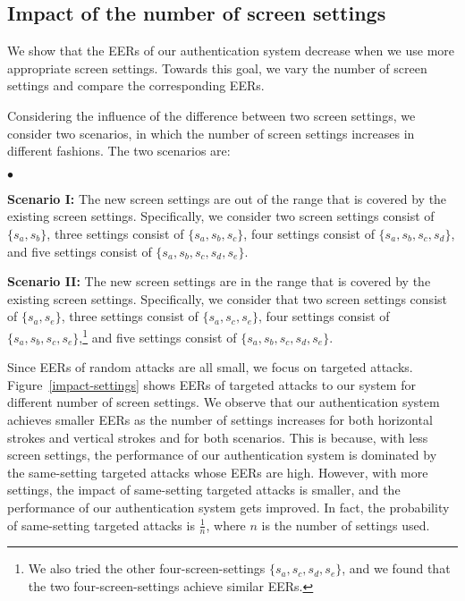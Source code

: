 \documentclass{sig-alternate-05-2015}
\newenvironment{packeditemize}{\begin{list}{$\bullet$}{\setlength{\itemsep}{2pt}\addtolength{\labelwidth}{4pt}\setlength{\leftmargin}{20pt}\setlength{\listparindent}{\parindent}\setlength{\parsep}{0pt}\setlength{\topsep}{0pt}}}{\end{list}}
\begin{document}
\subsection{Impact of the number of screen settings} We show that the EERs of our authentication system decrease when we use more appropriate screen settings. 
Towards this goal, we vary the number of screen settings and compare the corresponding EERs.

Considering the influence of the difference between two screen settings, we consider two scenarios, in which the number of screen settings increases in different fashions. 
The two scenarios are:
\begin{packeditemize}
\item {\bf Scenario I:} The new screen settings are out of the range that is covered by the existing screen settings.
Specifically, we consider two screen settings consist of $\{s_a,s_b\}$, three settings consist of $\{s_a,s_b,s_c\}$, four settings consist of $\{s_a,s_b,s_c,s_d\}$, and five settings consist of $\{s_a,s_b,s_c,s_d,s_e\}$.
\item {\bf Scenario II:} The new screen settings are in the range that is covered by the existing screen settings.
Specifically, we consider that two screen settings consist of $\{s_a,s_e\}$,
three settings consist of $\{s_a,s_c,s_e\}$, four settings consist of
$\{s_a,s_b,s_c,s_e\}$,\footnote{We also tried the other four-screen-settings $\{s_a,s_c,s_d,
s_e\}$, and we found that the two four-screen-settings achieve similar EERs.} and five settings consist of $\{s_a,s_b,s_c,s_d,s_e\}$.
\end{packeditemize}  





Since EERs of random attacks are all small, we focus on targeted attacks. 
Figure~\ref{impact-settings} shows EERs of targeted attacks to our system for different number of screen settings. We observe that  our authentication system achieves smaller EERs as the number of settings increases for both horizontal strokes and vertical strokes and for both scenarios. This is because,  with less screen settings, the performance of our authentication system 
is dominated by the same-setting targeted attacks whose EERs are high. 
However, with more settings, the impact of same-setting targeted attacks is smaller,
 and the performance of our authentication system gets improved. In fact, the probability of same-setting targeted attacks
 is $\frac{1}{n}$, where $n$ is the number of
settings used.
\end{document}
